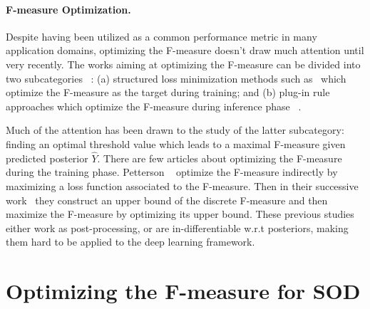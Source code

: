 \documentclass[10pt,twocolumn,letterpaper]{article}
\begin{document}
\paragraph{F-measure Optimization.} 
Despite having been utilized as a common performance metric
in many application domains,
optimizing the F-measure doesn't draw much attention until very recently.
%
The works aiming at optimizing the F-measure can be divided into two subcategories
~\cite{dembczynski2013optimizing}:
(a) structured loss minimization methods such as~\cite{petterson2010reverse, petterson2011submodular}
which optimize the F-measure as the target during training;
and (b) plug-in rule approaches which optimize the F-measure during inference phase
~\cite{jansche2007maximum,dembczynski2011exact,quevedo2012multilabel,nan2012optimizing}.

Much of the attention has been drawn to the study of the latter subcategory:
finding an optimal threshold value which leads to a maximal F-measure given predicted
posterior $\hat{Y}$.
%
There are few articles about optimizing the F-measure during the training phase.
%
Petterson \etal ~\cite{petterson2010reverse} optimize the F-measure indirectly
by maximizing a loss function associated to the F-measure.
%
Then in their successive work~\cite{petterson2011submodular} they construct an
upper bound of the discrete F-measure
and then maximize the F-measure by optimizing its upper bound.
%
These previous studies either work as post-processing,
or are in-differentiable w.r.t posteriors,
making them hard to be applied to the deep learning framework.

\section{Optimizing the F-measure for SOD}

\end{document}

